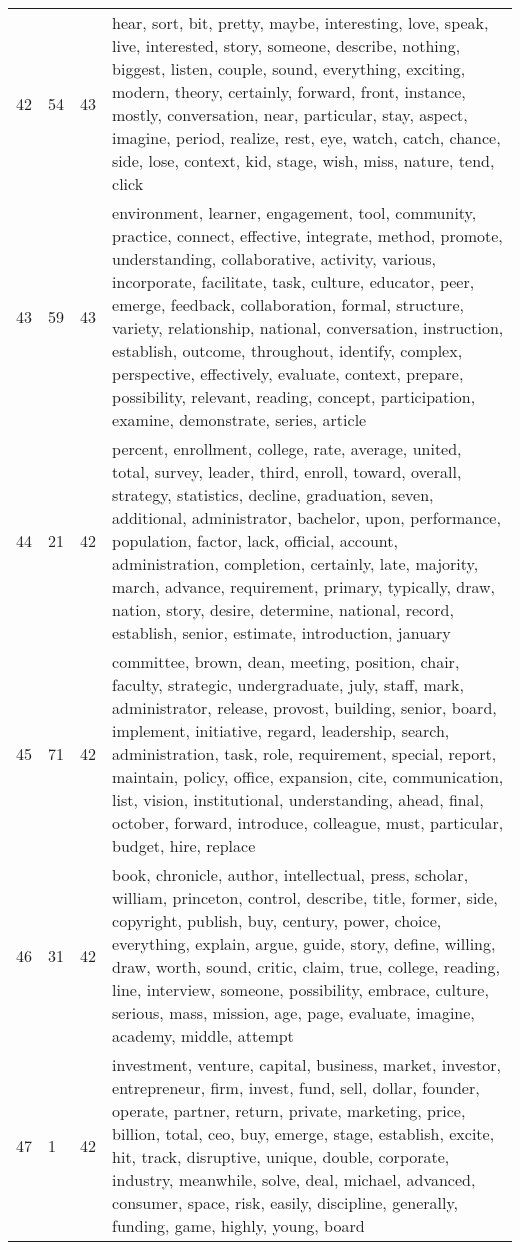 \begin{table}[ht]
{\begin{tabularx}{\textwidth}{llrX}
   42 & 54 & 43 & hear, sort, bit, pretty, maybe, interesting, love, speak, live, interested, story, someone, describe, nothing, biggest, listen, couple, sound, everything, exciting, modern, theory, certainly, forward, front, instance, mostly, conversation, near, particular, stay, aspect, imagine, period, realize, rest, eye, watch, catch, chance, side, lose, context, kid, stage, wish, miss, nature, tend, click \\ 
   43 & 59 & 43 & environment, learner, engagement, tool, community, practice, connect, effective, integrate, method, promote, understanding, collaborative, activity, various, incorporate, facilitate, task, culture, educator, peer, emerge, feedback, collaboration, formal, structure, variety, relationship, national, conversation, instruction, establish, outcome, throughout, identify, complex, perspective, effectively, evaluate, context, prepare, possibility, relevant, reading, concept, participation, examine, demonstrate, series, article \\ 
   44 & 21 & 42 & percent, enrollment, college, rate, average, united, total, survey, leader, third, enroll, toward, overall, strategy, statistics, decline, graduation, seven, additional, administrator, bachelor, upon, performance, population, factor, lack, official, account, administration, completion, certainly, late, majority, march, advance, requirement, primary, typically, draw, nation, story, desire, determine, national, record, establish, senior, estimate, introduction, january \\ 
   45 & 71 & 42 & committee, brown, dean, meeting, position, chair, faculty, strategic, undergraduate, july, staff, mark, administrator, release, provost, building, senior, board, implement, initiative, regard, leadership, search, administration, task, role, requirement, special, report, maintain, policy, office, expansion, cite, communication, list, vision, institutional, understanding, ahead, final, october, forward, introduce, colleague, must, particular, budget, hire, replace \\ 
   46 & 31 & 42 & book, chronicle, author, intellectual, press, scholar, william, princeton, control, describe, title, former, side, copyright, publish, buy, century, power, choice, everything, explain, argue, guide, story, define, willing, draw, worth, sound, critic, claim, true, college, reading, line, interview, someone, possibility, embrace, culture, serious, mass, mission, age, page, evaluate, imagine, academy, middle, attempt \\ 
   47 & 1 & 42 & investment, venture, capital, business, market, investor, entrepreneur, firm, invest, fund, sell, dollar, founder, operate, partner, return, private, marketing, price, billion, total, ceo, buy, emerge, stage, establish, excite, hit, track, disruptive, unique, double, corporate, industry, meanwhile, solve, deal, michael, advanced, consumer, space, risk, easily, discipline, generally, funding, game, highly, young, board \\ 

\end{tabularx}}
\end{table}
